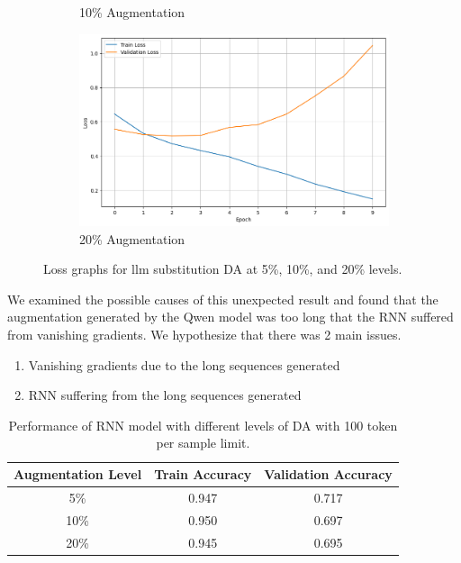 \documentclass{article}
\begin{document}
\begin{figure}[ht]
\begin{subfigure}[b]{0.3\textwidth}
    \caption{10\% Augmentation}
    \label{fig:llm_loss_10}
  \end{subfigure}
  \hfill
  \begin{subfigure}[b]{0.3\textwidth}
    \includegraphics[width=\textwidth]{img/llm_loss_20.png}
    \caption{20\% Augmentation}
    \label{fig:llm_loss_20}
  \end{subfigure}
  \caption{Loss graphs for llm substitution DA at 5\%, 10\%, and 20\% levels.}
  \label{fig:llm_substitution_loss}
\end{figure}

We examined the possible causes of this unexpected result and found that the
augmentation generated by the Qwen model was too long that the RNN suffered
from vanishing gradients. We hypothesize that there was 2 main issues.
\begin{enumerate}
  \item Vanishing gradients due to the long sequences generated
  \item RNN suffering from the long sequences generated
\end{enumerate}

\begin{table}[ht]
  \centering
  \begin{tabular}{|c|c|c|}
    \hline
    \textbf{Augmentation Level} & \textbf{Train Accuracy} & \textbf{Validation Accuracy} \\
    \hline
    5\%                         & 0.947                   & 0.717                        \\
    \hline
    10\%                        & 0.950                   & 0.697                        \\
    \hline
    20\%                        & 0.945                   & 0.695                        \\
    \hline
  \end{tabular}
  \caption{Performance of RNN model with different levels of DA with 100 token per sample limit.}
  \label{table:rnn_performance}
\end{table}
\end{document}
